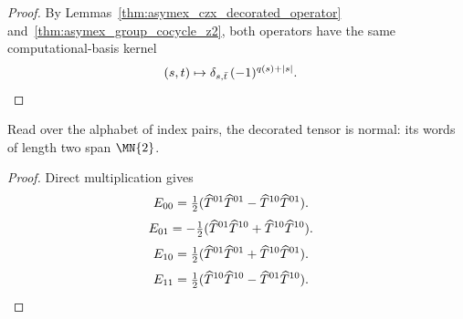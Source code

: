 \begin{proof}
    \leanok
    By Lemmas~\ref{thm:asymex_czx_decorated_operator}
    and~\ref{thm:asymex_group_cocycle_z2}, both operators have the same
    computational-basis kernel
    \begin{align}
        (s,t) & \mapsto\delta_{s,\bar t}\,(-1)^{q(s)+|s|}.
        \notag
    \end{align}
\end{proof}

\begin{lemma}
    \label{thm:asymex_czx_decorated_normal}
    \leanok
    Read over the alphabet of index pairs, the decorated tensor is normal:
    its words of length two span $\MN{2}$.
\end{lemma}

\begin{proof}
    \leanok
    Direct multiplication gives
    \begin{align}
        E_{00} & =\tfrac12(\widehat T^{01}\widehat T^{01}-\widehat T^{10}\widehat T^{01}).
        \notag
    \end{align}
    \begin{align}
        E_{01} & =-\tfrac12(\widehat T^{01}\widehat T^{10}+\widehat T^{10}\widehat T^{10}).
        \notag
    \end{align}
    \begin{align}
        E_{10} & =\tfrac12(\widehat T^{01}\widehat T^{01}+\widehat T^{10}\widehat T^{01}).
        \notag
    \end{align}
    \begin{align}
        E_{11} & =\tfrac12(\widehat T^{10}\widehat T^{10}-\widehat T^{01}\widehat T^{10}).
        \notag
    \end{align}
\end{proof}

